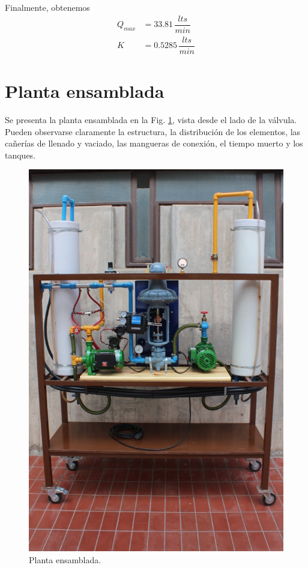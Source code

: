 Finalmente, obtenemos
\begin{align}
 Q_{max} &= 33.81\,\dfrac{lts}{min}
 \\
 K  &= 0.5285\,\dfrac{lts}{min}
\end{align}

\section{Planta ensamblada}
Se presenta la planta ensamblada en la Fig. \ref{fig:PlantaEnsamblada}, vista
desde el lado de la válvula.
Pueden observarse claramente la estructura, la distribución de los elementos,
las cañerías de llenado y vaciado, las mangueras de conexión, el tiempo muerto y
los tanques.

\begin{figure}[t]
	\centering
\includegraphics[width=.8\textwidth]{Cap2-DisenoEnsamblado/images/IMG_5123.JPG}
	\caption{Planta ensamblada.}
	\label{fig:PlantaEnsamblada}
\end{figure}

